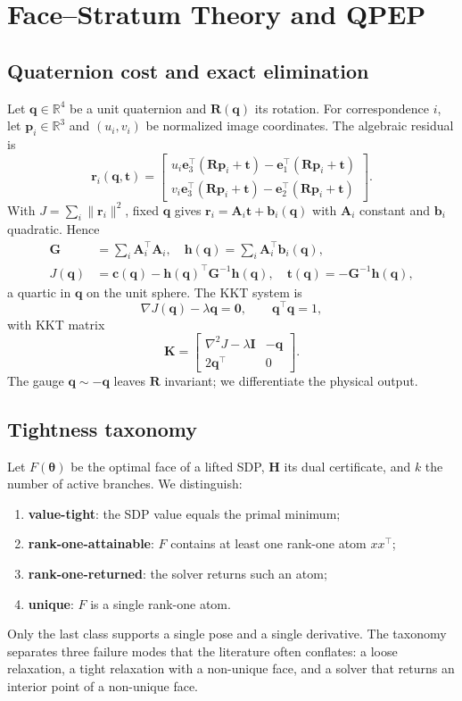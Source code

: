 \documentclass[conference]{IEEEtran}
\newcommand{\R}{\mathbb{R}}
\newcommand{\bq}{\bm{q}}
\newcommand{\bth}{\bm{\theta}}
\newcommand{\bR}{\bm{R}}
\newcommand{\bt}{\bm{t}}
\newcommand{\bH}{\bm{H}}
\newcommand{\bK}{\bm{K}}
\newcommand{\bA}{\bm{A}}
\newcommand{\bI}{\bm{I}}
\newcommand{\bh}{\bm{h}}
\newcommand{\bc}{\bm{c}}
\newcommand{\bG}{\bm{G}}
\newcommand{\bp}{\bm{p}}
\newcommand{\br}{\bm{r}}
\newcommand{\bb}{\bm{b}}
\newcommand{\be}{\bm{e}}
\newcommand{\bzero}{\bm{0}}
\begin{document}
\section{Face--Stratum Theory and QPEP}
\subsection{Quaternion cost and exact elimination}
Let $\bq\in\R^4$ be a unit quaternion and $\bR(\bq)$ its rotation. For correspondence $i$, let $\bp_i\in\R^3$ and $(u_i,v_i)$ be normalized image coordinates. The algebraic residual is
\begin{equation}
\br_i(\bq,\bt)=
\begin{bmatrix}
u_i\be_3^\top(\bR\bp_i+\bt)-\be_1^\top(\bR\bp_i+\bt)\\
v_i\be_3^\top(\bR\bp_i+\bt)-\be_2^\top(\bR\bp_i+\bt)
\end{bmatrix}.
\end{equation}
With $J=\sum_i\|\br_i\|^2$, fixed $\bq$ gives $\br_i=\bA_i\bt+\bb_i(\bq)$ with $\bA_i$ constant and $\bb_i$ quadratic. Hence
\begin{align}
\bG&=\sum_i\bA_i^\top\bA_i,\quad \bh(\bq)=\sum_i\bA_i^\top\bb_i(\bq),\\
J(\bq)&=\bc(\bq)-\bh(\bq)^\top\bG^{-1}\bh(\bq),\quad \bt(\bq)=-\bG^{-1}\bh(\bq),
\end{align}
a quartic in $\bq$ on the unit sphere. The KKT system is
\begin{equation}
\nabla J(\bq)-\lambda\bq=\bzero,\qquad \bq^\top\bq=1,
\label{eq:kkt}
\end{equation}
with KKT matrix
\begin{equation}
\bK=\begin{bmatrix}\nabla^2J-\lambda\bI&-\bq\\2\bq^\top&0\end{bmatrix}.
\label{eq:K}
\end{equation}
The gauge $\bq\sim-\bq$ leaves $\bR$ invariant; we differentiate the physical output.

\subsection{Tightness taxonomy}
Let $F(\bth)$ be the optimal face of a lifted SDP, $\bH$ its dual certificate, and $k$ the number of active branches. We distinguish:
\begin{enumerate}
\item \textbf{value-tight}: the SDP value equals the primal minimum;
\item \textbf{rank-one-attainable}: $F$ contains at least one rank-one atom $xx^\top$;
\item \textbf{rank-one-returned}: the solver returns such an atom;
\item \textbf{unique}: $F$ is a single rank-one atom.
\end{enumerate}
Only the last class supports a single pose and a single derivative. The taxonomy separates three failure modes that the literature often conflates: a loose relaxation, a tight relaxation with a non-unique face, and a solver that returns an interior point of a non-unique face.
\end{document}
